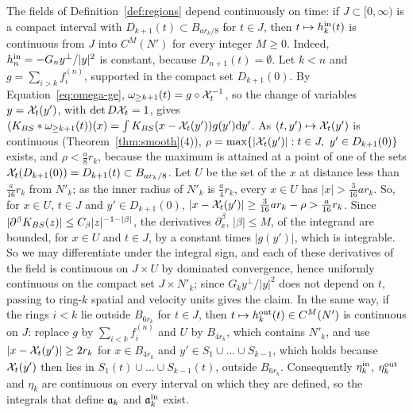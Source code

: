 The fields of Definition~\ref{def:regions} depend continuously on time: if
$J\subset[0,\infty)$ is a compact interval with $D_{k+1}(t)\subset B_{ar_k/8}$
for $t\in J$, then $t\mapsto h^{\mathrm{in}}_k(t)$ is continuous from $J$ into
$C^M(N')$ for every integer $M\ge0$. Indeed, $h^{\mathrm{in}}_n=-G_ny^\perp/|y|^2$ is
constant, because $D_{n+1}(t)=\emptyset$. Let $k<n$ and $g=\sum_{i>k}f^{(n)}_i$, supported in the compact set
$D_{k+1}(0)$. By Equation~\eqref{eq:omega-ge}, $\omega_{\ge k+1}(t)=g\circ\mathcal{X}_t^{-1}$,
so the change of variables $y=\mathcal{X}_t(y')$, with $\det D\mathcal{X}_t=1$, gives
$(K_{BS}\ast\omega_{\ge k+1}(t))(x)=\int K_{BS}(x-\mathcal{X}_t(y'))g(y')\dd y'$. As
$(t,y')\mapsto\mathcal{X}_t(y')$ is continuous (Theorem~\ref{thm:smooth}\textup{(4)}),
$\rho=\max\{|\mathcal{X}_t(y')|:t\in J,\ y'\in D_{k+1}(0)\}$ exists, and $\rho<\frac a8r_k$,
because the maximum is attained at a point of one of the sets
$\mathcal{X}_t(D_{k+1}(0))=D_{k+1}(t)\subset B_{ar_k/8}$.
Let $U$ be the set of the $x$ at distance less than $\frac a{16}r_k$ from $N'_k$;
as the inner radius of $N'_k$ is $\frac a4r_k$, every $x\in U$ has
$|x|>\frac3{16}ar_k$. So, for $x\in U$, $t\in J$ and $y'\in D_{k+1}(0)$,
$|x-\mathcal{X}_t(y')|\ge\frac3{16}ar_k-\rho>\frac a{16}r_k$. Since
$|\partial^\beta K_{BS}(z)|\le C_\beta|z|^{-1-|\beta|}$, the derivatives
$\partial^\beta_x$, $|\beta|\le M$, of the integrand are bounded, for $x\in U$
and $t\in J$, by a constant times $|g(y')|$, which is integrable. So we may
differentiate under the integral sign, and each of these derivatives of the field is
continuous on $J\times U$ by dominated convergence, hence uniformly continuous on
the compact set $J\times N'_k$; since $G_ky^\perp/|y|^2$ does not depend on
$t$, passing to ring-$k$ spatial and velocity units gives the claim. In the same way, if the rings $i<k$ lie outside $B_{6r_k}$
for $t\in J$, then $t\mapsto h^{\mathrm{out}}_k(t)\in C^M(N')$ is continuous on $J$:
replace $g$ by $\sum_{i<k}f^{(n)}_i$ and $U$ by $B_{4r_k}$, which contains $N'_k$,
and use $|x-\mathcal{X}_t(y')|\ge2r_k$ for
$x\in B_{4r_k}$ and $y'\in S_1\cup\dots\cup S_{k-1}$, which holds because
$\mathcal{X}_t(y')$ then lies in $S_1(t)\cup\dots\cup S_{k-1}(t)$, outside $B_{6r_k}$. Consequently $\eta^{\mathrm{in}}_k$, $\eta^{\mathrm{out}}_k$ and
$\eta_k$ are continuous on every interval on which they are defined, so the
integrals that define $\mathfrak{a}_k$ and $\mathfrak{a}^{\mathrm{in}}_k$ exist.

